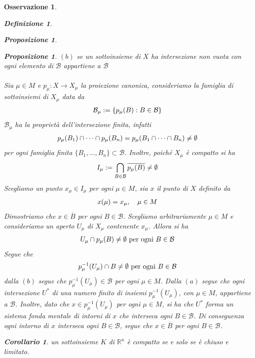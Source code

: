 \documentclass[oneside, 11pt]{amsbook}
\makeatletter
\newcommand{\0}{{(0)}}
\newcommand{\3}{{(3)}}
\theoremstyle{colonplain}
\newtheorem{prop}[thm]{Proposizione}
\newtheorem{cor}[thm]{Corollario}
\theoremstyle{colondefinition}
\newtheorem{defn}[thm]{Definizione}
\theoremstyle{colonremark}
\newtheorem{rmk}[thm]{Osservazione}
\numberwithin{equation}{chapter}
\renewcommand{\proofname}{Dimostrazione}
\renewenvironment{proof}[1][\proofname]{\par
  \pushQED{\end{proof}}%
  \normalfont \topsep6\p@\@plus6\p@\relax
  \trivlist
  \item[\hskip\labelsep\bfseries #1:]\ignorespaces
}{%
  \popQED\endtrivlist\@endpefalse
}
\makeatother
\begin{document}
\begin{rmk}
\begin{defn}
\begin{prop}
\begin{prop}
\begin{proof}
$(b)$ se un sottoinsieme di $X$ ha intersezione non vuota con ogni elemento di $\mathcal{B}$ appartiene a $\mathcal{B}$ \\ \\
Sia $\mu \in M$ e $p_\mu : X \longrightarrow X_\mu$ la proiezione canonica, consideriamo la famiglia di sottoinsiemi di $X_\mu$ data da
\begin{align}
    \mathcal{B}_\mu := \{ p_\mu(B) : B \in \mathcal{B} \} \notag
\end{align}
$\mathcal{B}_\mu$ ha la proprietà dell'intersezione finita, infatti
\begin{align}
    p_\mu(B_1) \cap \dots \cap p_\mu(B_n) = p_\mu(B_1 \cap \dots \cap B_n) \neq \emptyset \notag
\end{align}
per ogni famiglia finita $\{ B_1, \dots, B_n \} \subset \mathcal{B}$. Inoltre, poiché $X_\mu$ è compatto si ha
\begin{align}
    I_\mu := \bigcap_{B \in \mathcal{B}} \overline{p_\mu(B)} \neq \emptyset \notag
\end{align}
Scegliamo un punto $x_\mu \in I_\mu$ per ogni $\mu \in M$, sia $x$ il punto di $X$ definito da
\begin{align}
    x(\mu) = x_\mu, \quad \mu \in M \notag
\end{align}
Dimostriamo che $x \in \overline{B}$ per ogni $B \in \mathcal{B}$. Scegliamo arbitrariamente $\mu \in M$ e consideriamo un aperto $U_\mu$ di $X_\mu$ contenente $x_\mu$. Allora si ha
\begin{align}
    U_\mu \cap p_\mu(B) \neq \emptyset \text{ per ogni } B \in \mathcal{B} \notag
\end{align}
Segue che
\begin{align}
    p_\mu^{-1}(U_\mu) \cap B \neq \emptyset \text{ per ogni } B \in \mathcal{B} \notag
\end{align}
dalla $(b)$ segue che $p_\mu^{-1}(U_\mu) \in \mathcal{B}$ per ogni $\mu \in M$. Dalla $(a)$ segue che ogni intersezione $U^*$ di una numero finito di insiemi $p_\mu^{-1}(U_\mu)$, con $\mu \in M$, appartiene a $\mathcal{B}$. Inoltre, dato che $x \in p_\mu^{-1}(U_\mu)$ per ogni $\mu \in M$, si ha che $U^*$ forma un sistema fonda
mentale di intorni di $x$ che interseca ogni $B \in \mathcal{B}$. Di conseguenza ogni intorno di $x$ interseca ogni $B \in \mathcal{B}$, segue che $x \in \overline{B}$ per ogni $B \in \mathcal{B}$.\end{proof}
\begin{cor}
un sottoinsieme $K$ di $\mathbb{R}^n$ è compatto se e solo se è chiuso e limitato.

\end{cor}
\end{prop}
\end{prop}
\end{defn}
\end{rmk}
\end{document}
